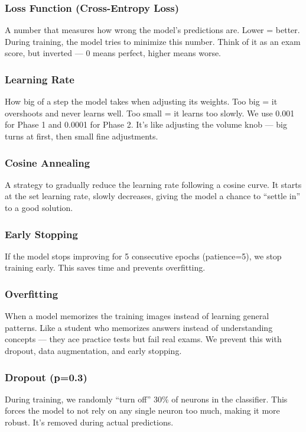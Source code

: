 \documentclass[11pt,a4paper]{article}
\begin{document}
\subsubsection{Loss Function (Cross-Entropy Loss)}
A number that measures how wrong the model's predictions are. Lower = better. During training, the model tries to minimize this number. Think of it as an exam score, but inverted --- 0 means perfect, higher means worse.

\subsubsection{Learning Rate}
How big of a step the model takes when adjusting its weights. Too big = it overshoots and never learns well. Too small = it learns too slowly. We use 0.001 for Phase 1 and 0.0001 for Phase 2. It's like adjusting the volume knob --- big turns at first, then small fine adjustments.

\subsubsection{Cosine Annealing}
A strategy to gradually reduce the learning rate following a cosine curve. It starts at the set learning rate, slowly decreases, giving the model a chance to ``settle in'' to a good solution.

\subsubsection{Early Stopping}
If the model stops improving for 5 consecutive epochs (patience=5), we stop training early. This saves time and prevents overfitting.

\subsubsection{Overfitting}
When a model memorizes the training images instead of learning general patterns. Like a student who memorizes answers instead of understanding concepts --- they ace practice tests but fail real exams. We prevent this with dropout, data augmentation, and early stopping.

\subsubsection{Dropout (p=0.3)}
During training, we randomly ``turn off'' 30\% of neurons in the classifier. This forces the model to not rely on any single neuron too much, making it more robust. It's removed during actual predictions.
\end{document}
